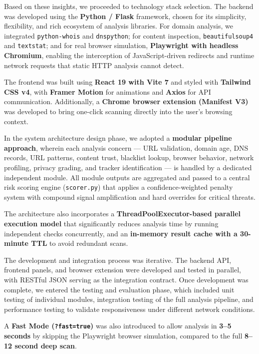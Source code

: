 Based on these insights, we proceeded to technology stack selection. The backend was developed using the \textbf{Python / Flask} framework, chosen for its simplicity, flexibility, and rich ecosystem of analysis libraries. For domain analysis, we integrated \texttt{python-whois} and \texttt{dnspython}; for content inspection, \texttt{beautifulsoup4} and \texttt{textstat}; and for real browser simulation, \textbf{Playwright with headless Chromium}, enabling the interception of JavaScript-driven redirects and runtime network requests that static HTTP analysis cannot detect.

The frontend was built using \textbf{React 19 with Vite 7} and styled with \textbf{Tailwind CSS v4}, with \textbf{Framer Motion} for animations and \textbf{Axios} for API communication. Additionally, a \textbf{Chrome browser extension (Manifest V3)} was developed to bring one-click scanning directly into the user's browsing context.

In the system architecture design phase, we adopted a \textbf{modular pipeline approach}, wherein each analysis concern — URL validation, domain age, DNS records, URL patterns, content trust, blacklist lookup, browser behavior, network profiling, privacy grading, and tracker identification — is handled by a dedicated independent module. All module outputs are aggregated and passed to a central risk scoring engine (\texttt{scorer.py}) that applies a confidence-weighted penalty system with compound signal amplification and hard overrides for critical threats.

The architecture also incorporates a \textbf{ThreadPoolExecutor-based parallel execution model} that significantly reduces analysis time by running independent checks concurrently, and an \textbf{in-memory result cache with a 30-minute TTL} to avoid redundant scans.

The development and integration process was iterative. The backend API, frontend panels, and browser extension were developed and tested in parallel, with RESTful JSON serving as the integration contract. Once development was complete, we entered the testing and evaluation phase, which included unit testing of individual modules, integration testing of the full analysis pipeline, and performance testing to validate responsiveness under different network conditions.

A \textbf{Fast Mode (\texttt{?fast=true})} was also introduced to allow analysis in \textbf{3–5 seconds} by skipping the Playwright browser simulation, compared to the full \textbf{8–12 second deep scan}.

